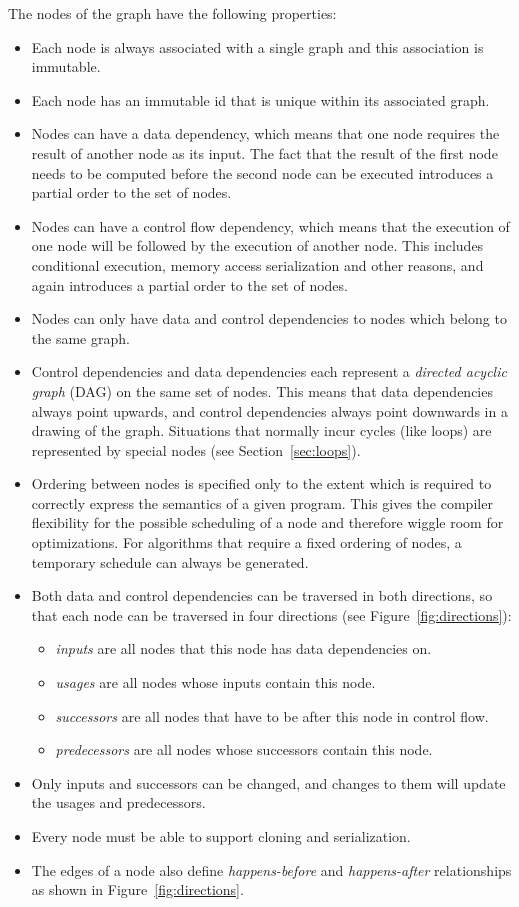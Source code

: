 \documentclass[twocolumn]{svjour3}
\begin{document}
The nodes of the graph have the following properties:
\begin{itemize}
    \item Each node is always associated with a single graph and this association is immutable.
    \item Each node has an immutable id that is unique within its associated graph.
    \item Nodes can have a data dependency, which means that one node requires the result of another node as its input. The fact that the result of the first node needs to be computed before the second node can be executed introduces a partial order to the set of nodes.
    \item Nodes can have a control flow dependency, which means that the execution of one node will be followed by the execution of another node. This includes conditional execution, memory access serialization and other reasons, and again introduces a partial order to the set of nodes.
    \item Nodes can only have data and control dependencies to nodes which belong to the same graph.
    \item Control dependencies and data dependencies each represent a \emph{directed acyclic graph} (DAG) on the same set of nodes. This means that data dependencies always point upwards, and control dependencies always point downwards in a drawing of the graph. Situations that normally incur cycles (like loops) are represented by special nodes (see Section~\ref{sec:loops}).
	\item Ordering between nodes is specified only to the extent which is required to correctly express the semantics of a given program. This gives the compiler flexibility for the possible scheduling of a node and therefore wiggle room for optimizations. For algorithms that require a fixed ordering of nodes, a temporary schedule can always be generated.
    \item Both data and control dependencies can be traversed in both directions, so that each node can be traversed in four directions (see Figure~\ref{fig:directions}):
    \begin{itemize}
        \item \emph{inputs} are all nodes that this node has data dependencies on.
        \item \emph{usages} are all nodes whose inputs contain this node.
        \item \emph{successors} are all nodes that have to be after this node in control flow.
        \item \emph{predecessors} are all nodes whose successors contain this node.
    \end{itemize}
    \item Only inputs and successors can be changed, and changes to them will update the usages and predecessors.
    \item Every node must be able to support cloning and serialization.
    \item The edges of a node also define \textit{happens-before} and \textit{happens-after} relationships as shown in Figure~\ref{fig:directions}.
\end{itemize}
\end{document}
